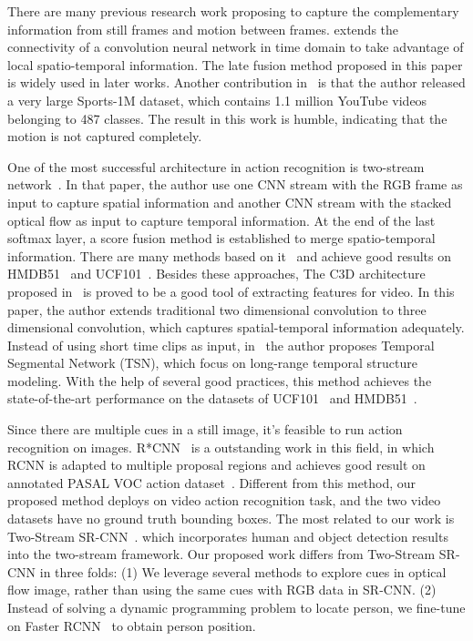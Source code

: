\documentclass[10pt,twocolumn,letterpaper]{article}
\begin{document}
%
There are many previous research work proposing to capture the complementary information from still frames and motion between frames. \cite{karpathy2014large} extends the connectivity of a convolution neural network in time domain to take advantage of local spatio-temporal information. The late fusion method proposed in this paper is widely used in later works. Another contribution in~\cite{karpathy2014large} is that the author released a very large Sports-1M dataset, which contains 1.1 million YouTube videos belonging to 487 classes. The result in this work is humble, indicating that the motion is not captured completely. 

One of the most successful architecture in action recognition is two-stream network~\cite{simonyan2014two}. In that paper, the author use one CNN stream with the RGB frame as input to capture spatial information and another CNN stream with the stacked optical flow as input to capture temporal information. At the end of the last softmax layer, a score fusion method is established to merge spatio-temporal information. There are many methods based on it~\cite{sun2015human, WangQT15a, Feichtenhofer16, wang2016two, wang2016temporal} and achieve good results on HMDB51~\cite{Kuehne11} and UCF101~\cite{soomro2012ucf101}. Besides these approaches,  The C3D architecture proposed in~\cite{Tran_2015_ICCV} is proved to be a good tool of extracting features for video.  In this paper, the author extends traditional two dimensional convolution to three dimensional convolution, which captures spatial-temporal information adequately. Instead of using short time clips as input, in~\cite{wang2016temporal} the author proposes Temporal Segmental Network (TSN), which focus on  long-range temporal structure modeling. With the help of several good practices, this method achieves the state-of-the-art performance on the datasets of UCF101~\cite{soomro2012ucf101} and HMDB51~\cite{Kuehne11}. 

Since there are multiple cues in a still image, it's feasible to run action recognition on images. R*CNN~\cite{gkioxari2015contextual} is a outstanding work in this field, in which RCNN is adapted to multiple proposal regions and achieves good result on annotated PASAL VOC action dataset~\cite{everingham2010pascal}. Different from this method, our proposed method deploys on video action recognition task, and the two video datasets have no ground truth bounding boxes. 
The most related to our work is Two-Stream SR-CNN~\cite{wang2016two}. which incorporates human and object detection results into the two-stream framework. Our proposed work differs from Two-Stream SR-CNN in three folds: (1) We leverage several methods to 
explore cues in optical flow image, rather than using the same cues with RGB data in SR-CNN. (2) Instead of solving a dynamic programming problem to locate person, we fine-tune on Faster RCNN~\cite{ren2015faster} to obtain person position.
\end{document}
